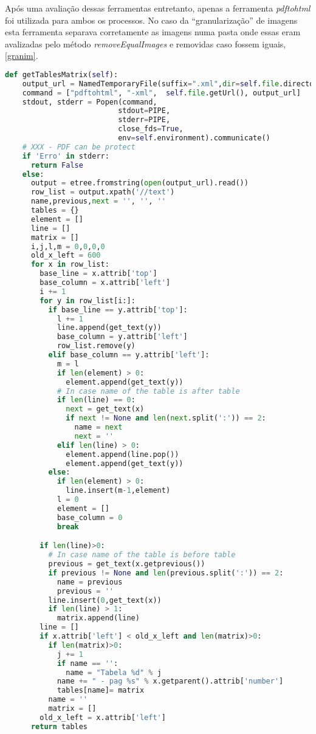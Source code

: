 Após uma avaliação dessas ferramentas entretanto, apenas a ferramenta \textit{pdftohtml} foi utilizada para ambos os processos.
No caso da ``granularização'' de imagens esta ferramenta separava corretamente as imagens numa pasta onde essas eram avalizadas pelo método \textit{removeEqualImages} e removidas caso fossem iguais, \ref{granim}. 

{\singlespace
\begin{lstlisting}[caption=método getTablesMatrix do PDFGranulator,language=python,label={granta}]
 def getTablesMatrix(self):
    output_url = NamedTemporaryFile(suffix=".xml",dir=self.file.directory_name).name
    command = ["pdftohtml", "-xml",  self.file.getUrl(), output_url]
    stdout, stderr = Popen(command,
                          stdout=PIPE,
                          stderr=PIPE,
                          close_fds=True,
                          env=self.environment).communicate()
    # XXX - PDF can be protect
    if 'Erro' in stderr:
      return False
    else:
      output = etree.fromstring(open(output_url).read())
      row_list = output.xpath('//text')
      name,previous,next = '', '', ''
      tables = {}
      element = []
      line = []
      matrix = []
      i,j,l,m = 0,0,0,0
      old_x_left = 600
      for x in row_list:
        base_line = x.attrib['top']
        base_column = x.attrib['left']
        i += 1
        for y in row_list[i:]:
          if base_line == y.attrib['top']:
            l += 1
            line.append(get_text(y))
            base_column = y.attrib['left']
            row_list.remove(y)
          elif base_column == y.attrib['left']:
            m = l
            if len(element) > 0:
              element.append(get_text(y))
            # In case name of the table is after table
            if len(line) == 0:
              next = get_text(x)
              if next != None and len(next.split(':')) == 2:
                name = next
                next = ''
            elif len(line) > 0:
              element.append(line.pop())
              element.append(get_text(y))
          else:
            if len(element) > 0:
              line.insert(m-1,element)
            l = 0
            element = []
            base_column = 0
            break

        if len(line)>0:
          # In case name of the table is before table
          previous = get_text(x.getprevious())
          if previous != None and len(previous.split(':')) == 2:
            name = previous
            previous = ''
          line.insert(0,get_text(x))
          if len(line) > 1:
            matrix.append(line)
        line = []
        if x.attrib['left'] < old_x_left and len(matrix)>0:
          if len(matrix)>0:
            j += 1
            if name == '':
              name = "Tabela %d" % j
            name += " - pag %s" % x.getparent().attrib['number']
            tables[name]= matrix
          name = ''
          matrix = []
        old_x_left = x.attrib['left']
      return tables

\end{lstlisting}
}

